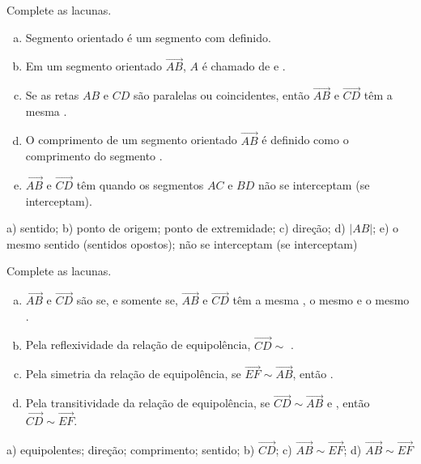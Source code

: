 \begin{exer}
  Complete as lacunas.
  \begin{enumerate}[a)]
    \item Segmento orientado é um segmento com \underline{\phantom{sentido}} definido.
    \item Em um segmento orientado $\overrightarrow{AB}$, $A$ é chamado de \underline{\phantom{ponto de origem}} e \underline{\phantom{ponto de extremidade}}.
    \item Se as retas $AB$ e $CD$ são paralelas ou coincidentes, então $\overrightarrow{AB}$ e $\overrightarrow{CD}$ têm a mesma \underline{\phantom{direção}}.
    \item O comprimento de um segmento orientado $\overrightarrow{AB}$ é definido como o comprimento do segmento \underline{\phantom{|AB|}}.
    \item $\overrightarrow{AB}$ e $\overrightarrow{CD}$ têm \underline{\phantom{o mesmo sentido (sentidos opostos)}} quando os segmentos $AC$ e $BD$ não se interceptam (se interceptam).
  \end{enumerate}
\end{exer}
\begin{resp}
  a) sentido; b) ponto de origem; ponto de extremidade;  c) direção; d) $|AB|$; e) o mesmo sentido (sentidos opostos); não se interceptam (se interceptam)
\end{resp}

\begin{exer}
  Complete as lacunas.
  \begin{enumerate}[a)]
    \item $\overrightarrow{AB}$ e $\overrightarrow{CD}$ são \underline{\phantom{equipolentes}} se, e somente se, $\overrightarrow{AB}$ e $\overrightarrow{CD}$ têm a mesma \underline{\phantom{direção}}, o mesmo \underline{\phantom{comprimento}} e o mesmo \underline{\phantom{sentido}}.
    \item Pela reflexividade da relação de equipolência, $\overrightarrow{CD}\sim$ \underline{}.
    \item Pela simetria da relação de equipolência, se $\overrightarrow{EF}\sim\overrightarrow{AB}$, então \underline{}.
    \item Pela transitividade da relação de equipolência, se $\overrightarrow{CD}\sim\overrightarrow{AB}$ e \underline{}, então $\overrightarrow{CD}\sim\overrightarrow{EF}$.
  \end{enumerate}
\end{exer}
\begin{resp}
  a) equipolentes; direção; comprimento; sentido; b) $\overrightarrow{CD}$; c) $\overrightarrow{AB}\sim\overrightarrow{EF}$; d) $\overrightarrow{AB}\sim\overrightarrow{EF}$
\end{resp}


